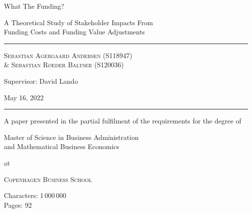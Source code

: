 \documentclass[main.tex]{subfiles}
\begin{document}
	\begin{titlepage}
		\centering
		\vspace{5cm}
		{\fontsize{48pt}{1pt}\selectfont What The Funding? \par}
		\vspace{0.5cm}
		{\Large A Theoretical Study of Stakeholder Impacts From \\ 
				Funding Costs and Funding Value Adjustments \par}
		\rule{\textwidth}{1px}\par
		{\scshape\large 
			Sebastian Agergaard Andersen {\scriptsize(S118947)} \\ %
			\& Sebastian Røeder Baltser {\scriptsize(S120036)} %
		\par}
		Supervisor: David Lando \\
		

		\scalebox{0.95}{%
			\begin{tikzpicture}[remember picture,overlay,shift={([yshift=0.5cm]current page.center)}]
				
			\end{tikzpicture}        
		}
		\vfill
		
		{\Large May 16, 2022 \par}		
		\rule{\textwidth}{1px}\par
		{A paper presented in the partial fulfilment
		of the requirements for the degree of \\}
		{\Large Master of Science in Business Administration \\
				and Mathematical Business Economics \par}
		at \par 
		{\scshape\LARGE Copenhagen Business School\par}
		\vspace{0.5cm}
		Characters: 1\,000\,000 \\
		Pages: 92
		
		\thispagestyle{empty}
	\end{titlepage}
	\restoregeometry
\end{document}
